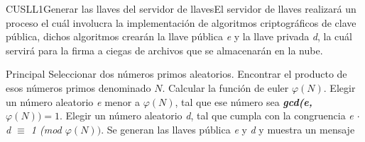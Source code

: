 


\begin{UseCase}{CUSLL1}{Generar las llaves del servidor de llaves}{El servidor de llaves realizará un proceso el cuál involucra la implementación de algoritmos criptográficos de clave pública, dichos algoritmos crearán la  llave pública \textit{e} y la llave privada \textit{d}, la cuál servirá para la firma a ciegas de archivos que se almacenarán en la nube.}

				
\end{UseCase}


\begin{UCtrayectoria}{Principal}
	\UCpaso Seleccionar dos números primos aleatorios.  \label{CUSLL1Regreso}
	\UCpaso Encontrar el producto de esos números primos denominado $N$.
	\UCpaso Calcular la función de euler $\varphi(N)$.
	\UCpaso Elegir un número aleatorio \textit{e} menor a $\varphi(N)$, tal que ese número sea \textbf{\textit{gcd(e,$\varphi(N))=1$}}.  \label{CUSLL1Regreso2}
	\UCpaso Elegir un número aleatorio \textit{d}, tal que cumpla con la congruencia  \textit{e $\cdot$ d $\equiv$ 1 (mod $\varphi(N))$}.  \label{CUSLL1Regreso3}
	\UCpaso Se generan las llaves pública \textit{e} y \textit{d} y muestra un mensaje 
\end{UCtrayectoria}

